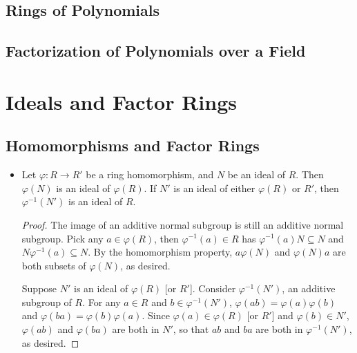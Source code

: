 \documentclass[11pt]{article}
\renewcommand{\phi}{\varphi}
\begin{document}
\subsection{Rings of Polynomials}
\subsection{Factorization of Polynomials over a Field}



\section{Ideals and Factor Rings}
\setcounter{subsection}{25}
\subsection{Homomorphisms and Factor Rings}
\begin{itemize}
    \item Let $\phi: R \to R'$ be a ring homomorphism, and $N$ be an ideal of $R$. Then $\phi(N)$ is an ideal of $\phi(R)$. If $N'$ is an ideal of either $\phi(R)$ or $R'$, then $\phi^{-1}(N')$ is an ideal of $R$.    
    \begin{proof}
        The image of an additive normal subgroup is still an additive normal subgroup. Pick any $a \in \phi(R)$, then $\phi^{-1}(a) \in R$ has $\phi^{-1}(a)N \subseteq N$ and $N\phi^{-1}(a) \subseteq N$. By the homomorphism property, $a \phi(N)$ and $\phi(N)a$ are both subsets of $\phi(N)$, as desired.

        Suppose $N'$ is an ideal of $\phi(R)$ [or $R'$]. Consider $\phi^{-1}(N')$, an additive subgroup of $R$. For any $a \in R$ and $b \in \phi^{-1}(N')$, $\phi(ab)=\phi(a)\phi(b)$ and $\phi(ba)=\phi(b)\phi(a)$. Since $\phi(a) \in \phi(R)$ [or $R'$] and $\phi(b) \in N'$, $\phi(ab)$ and $\phi(ba)$ are both in $N'$, so that $ab$ and $ba$ are both in $\phi^{-1}(N')$, as desired.
    \end{proof}
\end{itemize}
\end{document}
